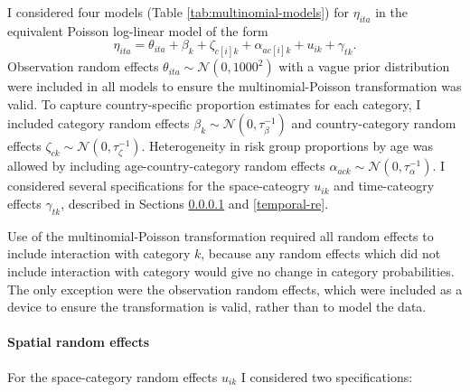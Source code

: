 \documentclass[a4paper, nobind]{templates/ociamthesis}
\begin{document}
I considered four models (Table \ref{tab:multinomial-models}) for \(\eta_{ita}\) in the equivalent Poisson log-linear model of the form
\begin{equation}
\eta_{ita} = \theta_{ita} + \beta_k + \zeta_{c[i]k} + \alpha_{ac[i]k} + u_{ik} + \gamma_{tk}.
\end{equation}
Observation random effects \(\theta_{ita} \sim \mathcal{N}(0, 1000^2)\) with a vague prior distribution were included in all models to ensure the multinomial-Poisson transformation was valid.
To capture country-specific proportion estimates for each category, I included category random effects \(\beta_k \sim \mathcal{N}(0, \tau_\beta^{-1})\) and country-category random effects \(\zeta_{ck} \sim \mathcal{N}(0, \tau_\zeta^{-1})\).
Heterogeneity in risk group proportions by age was allowed by including age-country-category random effects \(\alpha_{ack} \sim \mathcal{N}(0, \tau_\alpha^{-1})\).
I considered several specifications for the space-cateogry \(u_{ik}\) and time-cateogry effects \(\gamma_{tk}\), described in Sections \ref{spatial-re} and \ref{temporal-re}.

Use of the multinomial-Poisson transformation required all random effects to include interaction with category \(k\), because any random effects which did not include interaction with category would give no change in category probabilities.
The only exception were the observation random effects, which were included as a device to ensure the transformation is valid, rather than to model the data.

\hypertarget{spatial-re}{%
\paragraph{Spatial random effects}\label{spatial-re}}

For the space-category random effects \(u_{ik}\) I considered two specifications:
\end{document}
